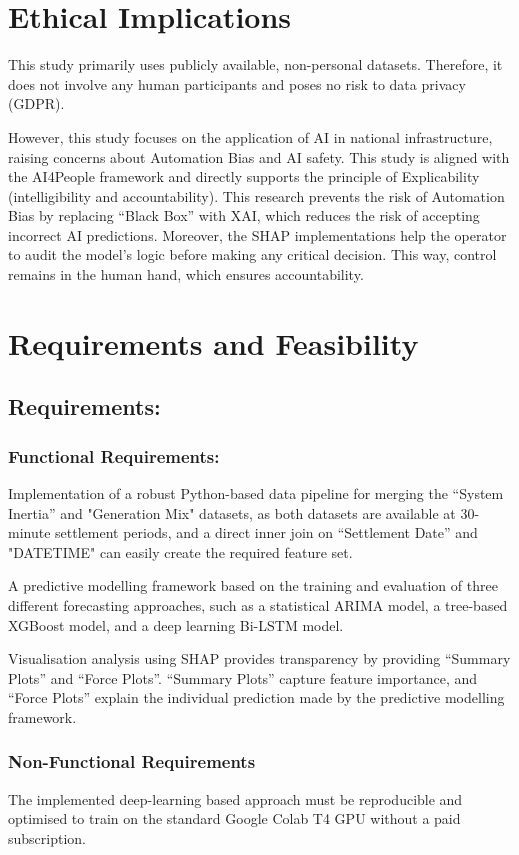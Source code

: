 \documentclass[12pt,a4paper,onecolumn]{article}
\begin{document}
\section{Ethical Implications}
\label{sec:ethics}
This study primarily uses publicly available, non-personal datasets. Therefore, it does not involve any human participants and poses no risk to data privacy (GDPR).

However, this study focuses on the application of AI in national infrastructure, raising concerns about Automation Bias and AI safety. This study is aligned with the AI4People framework and directly supports the principle of Explicability (intelligibility and accountability). This research prevents the risk of Automation Bias by replacing “Black Box” with XAI, which reduces the risk of accepting incorrect AI predictions. Moreover, the SHAP implementations help the operator to audit the model's logic before making any critical decision. This way, control remains in the human hand, which ensures accountability.


\section{Requirements and Feasibility}
\label{sec:req}
\subsection{Requirements:}
\subsubsection{Functional Requirements:}
Implementation of a robust Python-based data pipeline for merging the “System Inertia” and "Generation Mix" datasets, as both datasets are available at 30-minute settlement periods, and a direct inner join on “Settlement Date” and "DATETIME" can easily create the required feature set.

A predictive modelling framework based on the training and evaluation of three different forecasting approaches, such as a statistical ARIMA model, a tree-based XGBoost model, and a deep learning Bi-LSTM model.

Visualisation analysis using SHAP provides transparency by providing “Summary Plots” and “Force Plots”. “Summary Plots” capture feature importance, and “Force Plots” explain the individual prediction made by the predictive modelling framework.
\subsubsection{Non-Functional Requirements}
The implemented deep-learning based approach must be reproducible and optimised to train on the standard Google Colab T4 GPU without a paid subscription.
\end{document}
